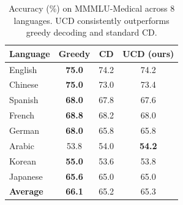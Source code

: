 \begin{table}[t]
\centering
\small
\begin{tabular}{lccc}
\toprule
Language & Greedy & CD & UCD (ours) \\
\midrule
English & \textbf{75.0} & 74.2 & 74.2 \\
Chinese & \textbf{75.0} & 73.0 & 73.4 \\
Spanish & \textbf{68.0} & 67.8 & 67.6 \\
French & \textbf{68.8} & 68.2 & 68.0 \\
German & \textbf{68.0} & 65.8 & 65.8 \\
Arabic & 53.8 & 54.0 & \textbf{54.2} \\
Korean & \textbf{55.0} & 53.6 & 53.8 \\
Japanese & \textbf{65.6} & 65.0 & 65.0 \\
\midrule
\textbf{Average} & \textbf{66.1} & 65.2 & 65.3 \\
\bottomrule
\end{tabular}
\caption{Accuracy (\%) on MMMLU-Medical across 8 languages. UCD consistently outperforms greedy decoding and standard CD.}
\label{tab:mmmlu_medical_main}
\end{table}